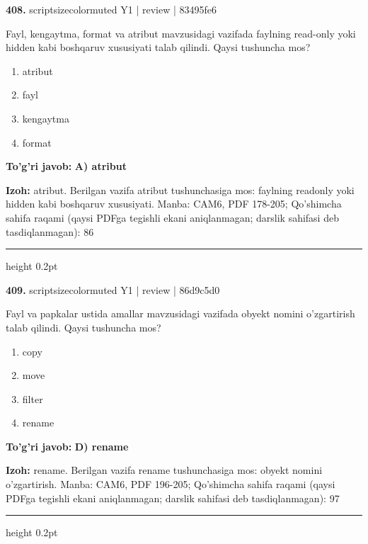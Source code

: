 \documentclass[10pt,a4paper]{article}
\begin{document}
{\bfseries\sffamily\color{ink} 408.} {scriptsizecolor{muted} Y1 | review | 83495fe6}
\par
Fayl, kengaytma, format va atribut mavzusidagi vazifada faylning read-only yoki hidden kabi boshqaruv xususiyati talab qilindi. Qaysi tushuncha mos?
\begin{enumerate}[label=\Alph*),leftmargin=9mm]
\item atribut
\item fayl
\item kengaytma
\item format
\end{enumerate}
\begin{tcolorbox}[enhanced,breakable,colback=teal!4,colframe=teal!60!black,boxrule=0.45pt,arc=1.2mm,left=2.7mm,right=2.7mm,top=1.8mm,bottom=1.8mm,before skip=2mm,after skip=2mm]
{\bfseries\sffamily\color{teal}To'g'ri javob:} \textbf{A) atribut}
\par\smallskip
{\bfseries Izoh:} atribut. Berilgan vazifa atribut tushunchasiga mos: faylning readonly yoki hidden kabi boshqaruv xususiyati. Manba: CAM6, PDF 178-205; Qo'shimcha sahifa raqami (qaysi PDFga tegishli ekani aniqlanmagan; darslik sahifasi deb tasdiqlanmagan): 86
\end{tcolorbox}
\vspace{2mm}\hrule height 0.2pt\vspace{3mm}

{\bfseries\sffamily\color{ink} 409.} {scriptsizecolor{muted} Y1 | review | 86d9c5d0}
\par
Fayl va papkalar ustida amallar mavzusidagi vazifada obyekt nomini o'zgartirish talab qilindi. Qaysi tushuncha mos?
\begin{enumerate}[label=\Alph*),leftmargin=9mm]
\item copy
\item move
\item filter
\item rename
\end{enumerate}
\begin{tcolorbox}[enhanced,breakable,colback=teal!4,colframe=teal!60!black,boxrule=0.45pt,arc=1.2mm,left=2.7mm,right=2.7mm,top=1.8mm,bottom=1.8mm,before skip=2mm,after skip=2mm]
{\bfseries\sffamily\color{teal}To'g'ri javob:} \textbf{D) rename}
\par\smallskip
{\bfseries Izoh:} rename. Berilgan vazifa rename tushunchasiga mos: obyekt nomini o'zgartirish. Manba: CAM6, PDF 196-205; Qo'shimcha sahifa raqami (qaysi PDFga tegishli ekani aniqlanmagan; darslik sahifasi deb tasdiqlanmagan): 97
\end{tcolorbox}
\vspace{2mm}\hrule height 0.2pt\vspace{3mm}
\end{document}
